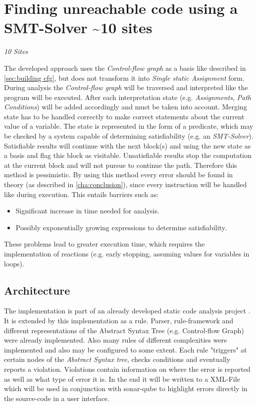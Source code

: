 
\chapter{Finding unreachable code using a SMT-Solver \textasciitilde 10 sites}
\label{cha:finding unreachable code using a smt-solver}
\emph{10 Sites}

The developed approach uses the \emph{Control-flow graph} as a basis like described in \ref{sec:building cfg}, but does not transform it into \emph{Single static Assignment} form.
During analysis the \emph{Control-flow graph} will be traversed and interpreted like the program will be executed.
After each interpretation state (e.g. \emph{Assignments}, \emph{Path Conditions}) will be added accordingly and must be taken into account.
Merging state has to be handled correctly to make correct statements about the current value of a variable.
The state is represented in the form of a predicate, which may be checked by a system capable of determining satisfiability (e.g. an \emph{SMT-Solver}).
Satisfiable results will continue with the next block(s) and using the new state as a basis and flag this block as visitable.
Unsatisfiable results stop the computation at the current block and will not pursue to continue the path.
Therefore this method is pessimistic.
By using this method every error should be found in theory (as described in \ref{cha:conclusion}), since every instruction will be handled like during execution. 
This entails barriers such as: 
\begin{itemize}
	\item Significant increase in time needed for analysis. 
	\item Possibly exponentially growing expressions to determine satisfiability.
\end{itemize}
These problems lead to greater execution time, which requires the implementation of reactions (e.g. early stopping, assuming values for variables in loops).

\section{Architecture}
The implementation is part of an already developed static code analysis project \cite{Prahofer_2012}. It is extended by this implementation as a rule. 
Parser, rule-framework and different representations of the Abstract Syntax Tree (e.g. Control-flow Graph) were already implemented. 
Also many rules of different complexities were implemented and also may be configured to some extent. 
Each rule "triggers" at certain nodes of the \emph{Abstract Syntax tree}, checks conditions and eventually reports a violation. 
Violations contain information on where the error is reported as well as what type of error it is. 
In the end it will be written to a XML-File which will be used in conjunction with sonar-qube to highlight errors directly in the source-code in a user interface.

